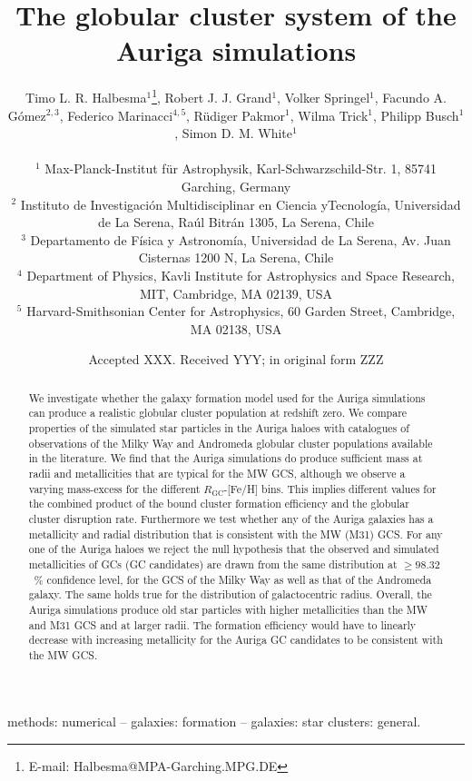 \documentclass[a4paper,fleqn,usenatbib]{mnras}
\title[Auriga GCS]{The globular cluster system of the Auriga simulations}
\author[T. L. R. Halbesma et al.]{\parbox[t]{\textwidth}{
    Timo L. R. Halbesma$^{1}$\thanks{E-mail: Halbesma@MPA-Garching.MPG.DE},
    Robert J. J. Grand$^{1}$,
    Volker Springel$^{1}$,
    Facundo A. G\'{o}mez$^{2,3}$,
    Federico Marinacci$^{4,5}$,
    R\"{u}diger Pakmor$^{1}$,
    Wilma Trick$^{1}$,
    Philipp Busch$^{1}$,
    Simon D. M. White$^{1}$
} \vspace{10pt} \\
$^{1}$ Max-Planck-Institut f\"ur Astrophysik, Karl-Schwarzschild-Str. 1,
    85741 Garching, Germany \\
$^{2}$ Instituto de Investigaci\'{o}n Multidisciplinar en Ciencia yTecnolog\'{i}a,
    Universidad de La Serena, Ra\'{u}l Bitr\'{a}n 1305, La Serena, Chile \\
$^{3}$ Departamento de F\'{i}sica y Astronom\'{i}a, Universidad de La Serena, Av.
    Juan Cisternas 1200 N, La Serena, Chile \\
$^{4}$ Department of Physics, Kavli Institute for Astrophysics and Space Research,
    MIT, Cambridge, MA 02139, USA \\
$^{5}$ Harvard-Smithsonian Center for Astrophysics, 60 Garden Street, Cambridge,
    MA 02138, USA \\
}
\date{Accepted XXX. Received YYY; in original form ZZZ}
\begin{document}
\label{firstpage}
\pagerange{\pageref{firstpage}--\pageref{lastpage}}
\maketitle

\begin{abstract}
We investigate whether the galaxy formation model used for the Auriga simulations
can produce a realistic globular cluster population at redshift zero. We compare
properties of the simulated star particles in the Auriga haloes with catalogues
of observations of the Milky Way and Andromeda globular cluster populations available
in the literature. We find that the Auriga simulations do produce sufficient mass
at radii and metallicities that are typical for the MW GCS, although we observe
a varying mass-excess for the different $R_{\text{GC}}$-[Fe/H] bins. This implies
different values for the combined product of the bound cluster formation efficiency
and the globular cluster disruption rate. Furthermore we test whether any of the
Auriga galaxies has a metallicity and radial distribution that is consistent with
the MW (M31) GCS. For any one of the Auriga haloes we reject the null hypothesis that
the observed and simulated metallicities of GCs (GC candidates) are drawn from 
the same distribution at $\geq98.32$~\% confidence level, for the GCS of the 
Milky Way as well as that of the Andromeda galaxy. The same holds true for the 
distribution of galactocentric radius. Overall, the Auriga simulations produce 
old star particles with higher metallicities than the MW and M31 GCS and at 
larger radii. The formation efficiency would have to linearly decrease with 
increasing metallicity for the Auriga GC candidates to be consistent with the MW GCS.
\end{abstract}

\begin{keywords}
methods: numerical -- galaxies: formation -- galaxies: star clusters: general.
\end{keywords}


\end{document}
